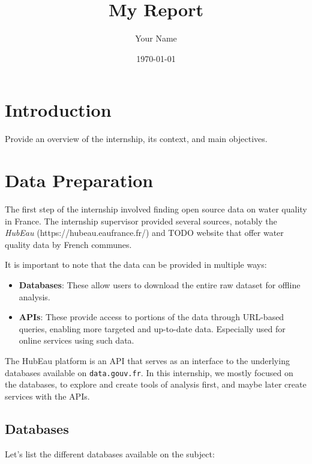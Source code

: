 \documentclass{article}
\title{My Report}
\author{Your Name}
\date{\today}
\begin{document}
\maketitle

\newpage
\tableofcontents
\newpage

\section{Introduction}
Provide an overview of the internship, its context, and main objectives.

\section{Data Preparation}
The first step of the internship involved finding open source data on water quality in France. 
The internship supervisor provided several sources, notably the \textit{HubEau} (https://hubeau.eaufrance.fr/) 
and TODO website that offer water quality data by French communes.

It is important to note that the data can be provided in multiple ways:
\begin{itemize}
    \item \textbf{Databases}: These allow users to download the entire raw dataset for offline analysis.
    \item \textbf{APIs}: These provide access to portions of the data through URL-based queries, 
        enabling more targeted and up-to-date data. Especially used for online services using such data.
\end{itemize}

The HubEau platform is an API that serves as an interface to the underlying databases available on \texttt{data.gouv.fr}.
In this internship, we mostly focused on the databases, to explore and create tools of analysis first, 
and maybe later create services with the APIs.
\subsection{Databases}
Let's list the different databases available on the subject:
\end{document}
